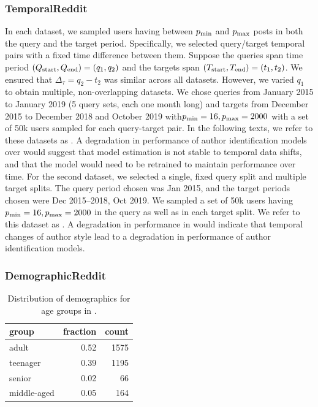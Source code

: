 \subsubsection{TemporalReddit} 
In each dataset, we sampled users having between $p_{\rm{min}}$ and $p_{\rm{max}}$ posts in both the query and the target period. 
Specifically, we selected query/target temporal pairs with a fixed time difference between them.
Suppose the queries span time period $(Q_{\rm{start}}, Q_{\rm{end}}) = (q_1, q_2)$ and the targets span $(T_{\rm{start}}, T_{\rm{end}}) = (t_1, t_2)$.
We ensured that $\Delta_\tau = q_2 - t_2$ was similar across all datasets. 
However, we varied $q_1$ to obtain multiple, non-overlapping datasets.
We chose queries from January 2015 to January 2019 (5 query sets, each one month long) and targets from December 2015 to December 2018 and October 2019 with$p_{\rm{min}} = 16, p_{\rm{max}} = 2000$ with a set of 50k users sampled for each query-target pair.
In the following texts, we refer to these datasets as \DSfixeddelta{}.
A degradation in performance of author identification models over \DSfixeddelta{} would suggest that model estimation is not stable to temporal data shifts, and that the model would need to be retrained to maintain performance over time.
For the second dataset, we selected a single, fixed query split and multiple target splits. 
The query period chosen was Jan 2015, and the target periods chosen were Dec 2015--2018, Oct 2019. 
We sampled a set of 50k users having $p_{\rm{min}} = 16, p_{\rm{max}} = 2000$ in the query as well as in each target split.
We refer to this dataset as \DSvarydelta{}. 
A degradation in performance in \DSvarydelta{} would indicate that temporal changes of author style lead to a degradation in performance of author identification models.

\subsubsection{DemographicReddit}

\begin{table}[h]
    \centering
    \begin{tabular}{lrr}
    \toprule
    group & fraction & count \\
    \midrule
    adult & 0.52 & 1575 \\
    teenager & 0.39 & 1195 \\
    senior & 0.02 & 66 \\
    middle-aged & 0.05 & 164 \\
    \bottomrule
    \end{tabular}
    \caption{Distribution of demographics for age groups in \DSagefixed{}.}
    \label{tab:demographics:age_dist}
\end{table}


